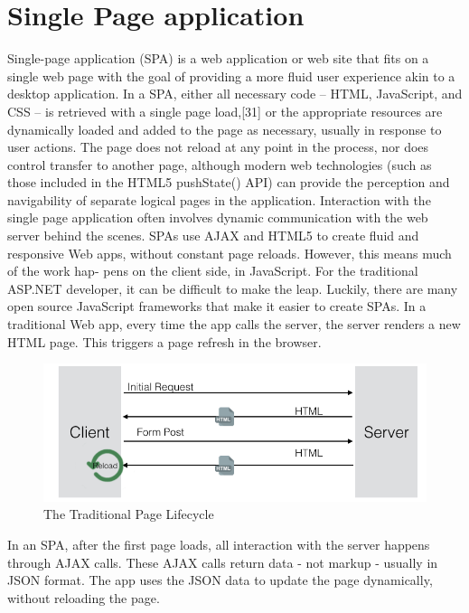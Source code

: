 \section{Single Page application}
\label{sec:signle_page_application}
Single-page application (SPA) is a web application or web site that fits on a single web page with the goal of providing a more fluid user experience akin to a desktop application. In a SPA, either all necessary code – HTML, JavaScript, and CSS – is retrieved with a single page load,[31] or the appropriate resources are dynamically loaded and added to the page as necessary, usually in response to user actions. The page does not reload at any point in the process, nor does control transfer to another page, although modern web technologies (such as those included in the HTML5 pushState() API) can provide the perception and navigability of separate logical pages in the application. Interaction with the single page application often involves dynamic communication with the web server behind the scenes.
\newline
SPAs use AJAX and HTML5 to create fluid and responsive Web apps, without constant page reloads. However, this means much of the work hap- pens on the client side, in JavaScript. For the traditional ASP.NET developer, it can be difficult to make the leap. Luckily, there are many open source JavaScript frameworks that make it easier to create SPAs.
In a traditional Web app, every time the app calls the server, the server renders a new HTML page. This triggers a page refresh in the browser.
\begin{figure}[htb]
 \centering
 \includegraphics[width=1.0\linewidth]{images/chapter4/trad_life.png}\hfill
 \caption[Traditional Page Lifecycle]{The Traditional Page Lifecycle}
 \label{fig:traditional_page_lifecycle}
\end{figure}
In an SPA, after the first page loads, all interaction with the server happens through AJAX calls. These AJAX calls return data - not markup - usually in JSON format. The app uses the JSON data to update the page dynamically, without reloading the page.
